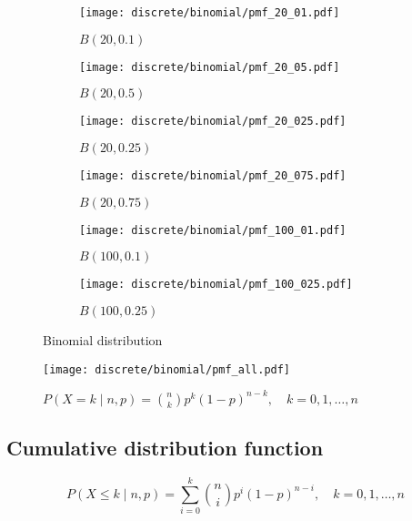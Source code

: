 \begin{figure}[H]
	\centering
	\begin{subfigure}[b]{0.45\textwidth}
		\texttt{[image: discrete/binomial/pmf\_20\_01.pdf]}
		\caption{$B(20, 0.1)$}
	\end{subfigure}
	\begin{subfigure}[b]{0.45\textwidth}
		\texttt{[image: discrete/binomial/pmf\_20\_05.pdf]}
		\caption{$B(20, 0.5)$}
	\end{subfigure}
	\begin{subfigure}[b]{0.45\textwidth}
		\texttt{[image: discrete/binomial/pmf\_20\_025.pdf]}
		\caption{$B(20, 0.25)$}
	\end{subfigure}
	\begin{subfigure}[b]{0.45\textwidth}
		\texttt{[image: discrete/binomial/pmf\_20\_075.pdf]}
		\caption{$B(20, 0.75)$}
	\end{subfigure}
	\begin{subfigure}[b]{0.45\textwidth}
		\texttt{[image: discrete/binomial/pmf\_100\_01.pdf]}
		\caption{$B(100, 0.1)$}
	\end{subfigure}
	\begin{subfigure}[b]{0.45\textwidth}
		\texttt{[image: discrete/binomial/pmf\_100\_025.pdf]}
		\caption{$B(100, 0.25)$}
	\end{subfigure}
	\caption{Binomial distribution}
\end{figure}

\begin{figure}[H]
	\texttt{[image: discrete/binomial/pmf\_all.pdf]}
	\caption{$P(X = k \mid n, p) = \binom{n}{k}p^{k}(1 - p)^{n - k}, \quad k = 0, 1, \ldots, n$}
\end{figure}

\subsection{Cumulative distribution function}
\[
	P(X \leq k \mid n, p) = \sum_{i = 0}^{k} \binom{n}{i}p^{i}(1 - p)^{n - i}, \quad k = 0, 1, \ldots, n
\]


